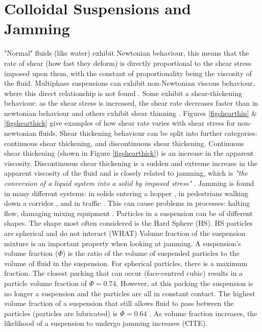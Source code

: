 \documentclass[a4]{report}
\begin{document}
	\section{Colloidal Suspensions and Jamming}
	"Normal" fluids (like water) exhibit Newtonian behaviour, this means that the rate of shear (how fast they deform) is directly proportional to the shear stress imposed upon them, with the constant of proportionality being the viscosity of the fluid\cite[p.~252]{schadict}. Multiphase suspensions can exhibit non-Newtonian viscous behaviour, where this direct relationship is not found \cite[p.~255-256]{schadict}. Some exhibit a shear-thickening behaviour: as the shear stress is increased, the shear rate decreases faster than in newtonian behaviour and others exhibit shear thinning \cite{backtypesofnonnewt}. Figures \ref{figshearthin} \& \ref{figshearthick} give examples of how shear rate varies with shear stress for non-newtonian fluids. Shear thickening behaviour can be split into further categories: continuous shear thickening, and discontinuous shear thickening. Continuous shear thickening (shown in Figure \ref{figshearthick})  is an increase in the apparent viscosity. Discontinuous shear thickening is a sudden and extreme increase in the apparent viscosity of the fluid and is closely related to jamming, which is \textit{"the conversion of a liquid system into a solid by imposed stress"} \cite{backhawjam}. Jamming is found in many different systems: in solids entering a hopper \cite{back2djam}, in pedestrians walking down a corridor \cite{backpedjam}, and in traffic \cite{backcarjam}. This can cause problems in processes: halting flow, damaging mixing equipment \cite{backshearjambertrand}. \newline \newline \noindent
	Particles in a suspension can be of different shapes. The shape most often considered is the Hard Sphere (HS). HS particles are spherical and do not interact (WHAT) \newline
	Volume fraction of the suspension mixture is an important property when looking at jamming. A suspension's volume fraction (\( \Phi \)) is the ratio of the volume of suspended particles to the volume of fluid in the suspension. For spherical particles, there is a maximum fraction. The closest packing that can occur (face-centred cubic) results in a particle volume fraction of \( \Phi = 0.74 \). However, at this packing the suspension is no longer a suspension and the particles are all in constant contact. The highest volume fraction of a suspension that still allows fluid to pass between the particles (particles are lubricated) is \( \Phi = 0.64 \) \cite{backguypoonjam}. As volume fraction increases, the likelihood of a suspension to undergo jamming increases (CITE).
\end{document}
